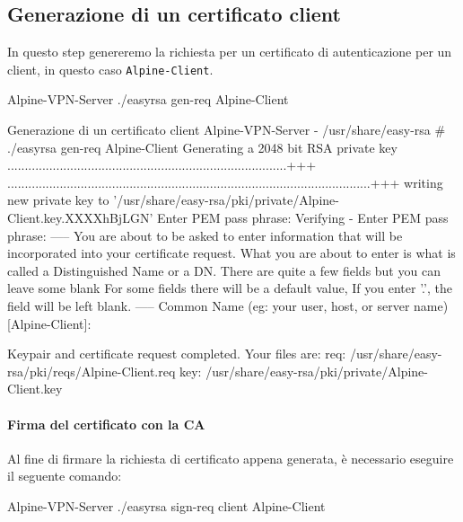 \documentclass{article}
\newcommand{\hostname}[1]{{\lstinline[basicstyle=\ttfamily\color{teal}]|#1|}}
\begin{document}
\subsection{Generazione di un certificato client} In questo step genereremo la richiesta per 
un certificato di autenticazione per un client, in questo caso \hostname{Alpine-Client}.
\begin{commandshell}{Alpine-VPN-Server}
./easyrsa gen-req Alpine-Client
\end{commandshell}
\begin{shelloutput}{Generazione di un certificato client}
Alpine-VPN-Server - /usr/share/easy-rsa # ./easyrsa gen-req Alpine-Client
Generating a 2048 bit RSA private key
................................................................................+++
........................................................................................................+++
writing new private key to '/usr/share/easy-rsa/pki/private/Alpine-Client.key.XXXXhBjLGN'
Enter PEM pass phrase:
Verifying - Enter PEM pass phrase:
-----
You are about to be asked to enter information that will be incorporated
into your certificate request.
What you are about to enter is what is called a Distinguished Name or a DN.
There are quite a few fields but you can leave some blank
For some fields there will be a default value,
If you enter '.', the field will be left blank.
-----
Common Name (eg: your user, host, or server name) [Alpine-Client]:

Keypair and certificate request completed. Your files are:
req: /usr/share/easy-rsa/pki/reqs/Alpine-Client.req
key: /usr/share/easy-rsa/pki/private/Alpine-Client.key
\end{shelloutput}

\paragraph{Firma del certificato con la CA} Al fine di firmare la richiesta di certificato
appena generata, è necessario eseguire il seguente comando:
\begin{commandshell}{Alpine-VPN-Server}
./easyrsa sign-req client Alpine-Client
\end{commandshell}

\vspace{1em}
\end{document}
